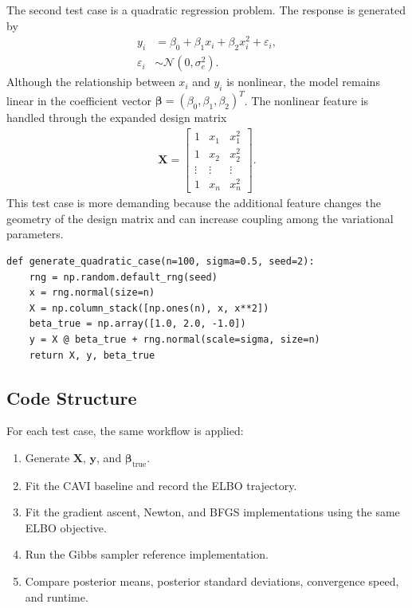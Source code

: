 \documentclass[11pt,a4paper]{article}
\newcommand{\N}{\mathcal{N}}
\begin{document}
The second test case is a quadratic regression problem. The response is generated by
\begin{align}
y_i &= \beta_0 + \beta_1 x_i + \beta_2 x_i^2 + \varepsilon_i,\\
\varepsilon_i &\sim \N(0,\sigma_e^2).
\end{align}
Although the relationship between $x_i$ and $y_i$ is nonlinear, the model remains linear in the coefficient vector $\bm{\beta}=(\beta_0,\beta_1,\beta_2)^T$. The nonlinear feature is handled through the expanded design matrix
\begin{align}
\bm{X} =
\begin{bmatrix}
1 & x_1 & x_1^2\\
1 & x_2 & x_2^2\\
\vdots & \vdots & \vdots\\
1 & x_n & x_n^2
\end{bmatrix}.
\end{align}
This test case is more demanding because the additional feature changes the geometry of the design matrix and can increase coupling among the variational parameters.

\begin{verbatim}
def generate_quadratic_case(n=100, sigma=0.5, seed=2):
    rng = np.random.default_rng(seed)
    x = rng.normal(size=n)
    X = np.column_stack([np.ones(n), x, x**2])
    beta_true = np.array([1.0, 2.0, -1.0])
    y = X @ beta_true + rng.normal(scale=sigma, size=n)
    return X, y, beta_true
\end{verbatim}

\subsection{Code Structure}

For each test case, the same workflow is applied:
\begin{enumerate}
\item Generate $\bm{X}$, $\bm{y}$, and $\bm{\beta}_{\mathrm{true}}$.
\item Fit the CAVI baseline and record the ELBO trajectory.
\item Fit the gradient ascent, Newton, and BFGS implementations using the same ELBO objective.
\item Run the Gibbs sampler reference implementation.
\item Compare posterior means, posterior standard deviations, convergence speed, and runtime.
\end{enumerate}
\end{document}
